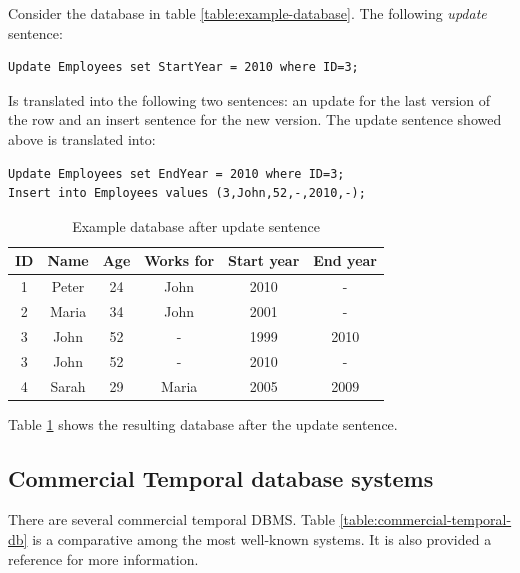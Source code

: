 \begin{example}
Consider the database in table \ref{table:example-database}. The following \emph{update} sentence:

\begin{verbatim}
Update Employees set StartYear = 2010 where ID=3;
\end{verbatim}

Is translated into the following two sentences: an update for the last version of the row and an insert sentence for the new version. The update sentence showed above is translated into:

\begin{verbatim}
Update Employees set EndYear = 2010 where ID=3;
Insert into Employees values (3,John,52,-,2010,-);
\end{verbatim}


\begin{table}
\centering
\caption{Example database after update sentence}
\begin{tabular}{c c c c c c }
\hline
\textbf{ID} & \textbf{Name} & \textbf{Age} & \textbf{Works for} & \textbf{Start year} & \textbf{End year} \\ \hline
1 & Peter & 24 & John &  2010 & - \\
2 & Maria & 34 & John & 2001 & - \\
3 & John & 52 & - &  1999 & 2010 \\
3 & John & 52 & - &  2010 & - \\
4 & Sarah & 29 & Maria &  2005 & 2009 \\
\hline 
\end{tabular}
\label{table:example-database-update}



\end{table}


Table \ref{table:example-database-update} shows the resulting database after the update sentence.

\end{example}


\subsection{\label{Comm-temp}Commercial Temporal database systems}
There are several commercial temporal DBMS. Table \ref{table:commercial-temporal-db} is a comparative among the most well-known systems. It is also provided a reference for more information. 

